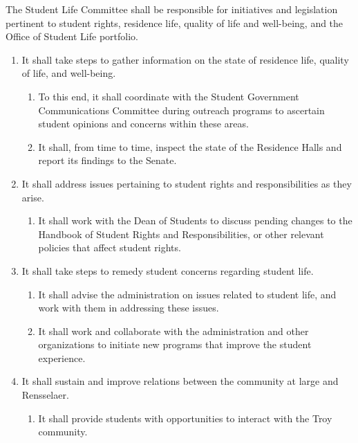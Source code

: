 \item The Student Life Committee shall be responsible for initiatives and legislation pertinent to student rights, residence life,
quality of life and well-being, and the Office of Student Life portfolio.
\begin{enumerate}
\item It shall take steps to gather information on the state of residence life, quality of life, and well-being.
\begin{enumerate}
\item To this end, it shall coordinate with the Student Government Communications Committee during outreach programs to
ascertain student opinions and concerns within these areas.
\item It shall, from time to time, inspect the state of the Residence Halls and report its findings to the Senate.
\end{enumerate}
\item It shall address issues pertaining to student rights and responsibilities as they arise.
\begin{enumerate}
\item It shall work with the Dean of Students to discuss pending changes to the Handbook of Student Rights and
Responsibilities, or other relevant policies that affect student rights.
\end{enumerate}
\item It shall take steps to remedy student concerns regarding student life.
\begin{enumerate}
\item It shall advise the administration on issues related to student life, and work with them in addressing these issues.
\item It shall work and collaborate with the administration and other organizations to initiate new programs that improve the
student experience.
\end{enumerate}
\item It shall sustain and improve relations between the community at large and Rensselaer.
\begin{enumerate}
\item It shall provide students with opportunities to interact with the Troy community.
\end{enumerate}
\end{enumerate}